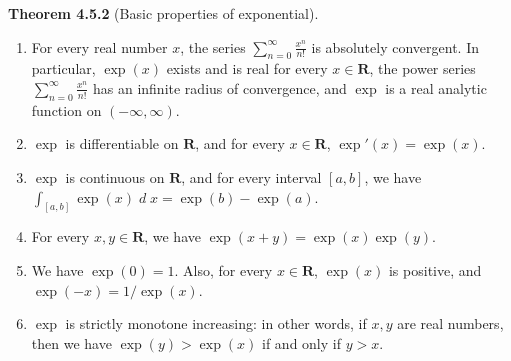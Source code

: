 \documentclass{book}
\DeclareMathOperator{\dd}{\mathit{d}}%
\newcommand{\titl}[1]{\noindent\textbf{#1}}
\begin{document}
\begin{framed}
\titl{Theorem 4.5.2} (Basic properties of exponential).
\begin{enumerate}
    \item For every real number $x$, the series $\sum_{n = 0}^{\infty} \frac{x^n}{n!}$ is absolutely convergent. In particular, $\exp(x)$ exists and is real for every $x \in \mathbf{R}$, the power series $\sum_{n = 0}^{\infty} \frac{x^n}{n!}$ has an infinite radius of convergence, and $\exp$ is a real analytic function on $(-\infty, \infty)$.
    \item $\exp$ is differentiable on $\mathbf{R}$, and for every $x \in \mathbf{R}$, $\exp'(x) = \exp(x)$.
    \item $\exp$ is continuous on $\mathbf{R}$, and for every interval $[a, b]$, we have $\int_{[a, b]} \exp(x) \dd x = \exp(b) - \exp(a)$.
    \item For every $x, y \in \mathbf{R}$, we have $\exp(x + y) = \exp(x)\exp(y)$.
    \item We have $\exp(0) = 1$. Also, for every $x \in \mathbf{R}$, $\exp(x)$ is positive, and $\exp(-x) = 1/\exp(x)$.
    \item $\exp$ is strictly monotone increasing: in other words, if $x, y$ are real numbers, then we have $\exp(y) > \exp(x)$ if and only if $y > x$.
\end{enumerate}
\end{framed}
\end{document}
